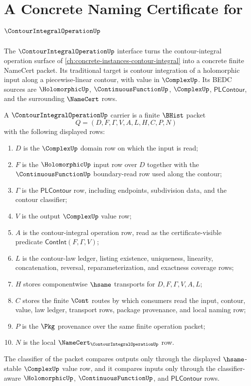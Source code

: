 \chapter{A Concrete Naming Certificate for $\ContourIntegralOperationUp$}
\label{ch:concrete-instances-contourintegraloperation-namecert}

The $\ContourIntegralOperationUp$ interface turns the contour-integral operation surface of \autoref{ch:concrete-instances-contour-integral} into a concrete finite NameCert packet. Its traditional target is contour integration of a holomorphic input along a piecewise-linear contour, with value in $\ComplexUp$. Its BEDC sources are $\HolomorphicUp$, $\ContinuousFunctionUp$, $\ComplexUp$, $\mathsf{PLContour}$, and the surrounding $\NameCert$ rows.

\begin{definition}
\label{def:contour-integral-operation-carrier}
A $\ContourIntegralOperationUp$ carrier is a finite $\BHist$ packet
$$
Q=(D,F,\Gamma,V,A,L,H,C,P,N)
$$
with the following displayed rows:
\begin{enumerate}
\item $D$ is the $\ComplexUp$ domain row on which the input is read;
\item $F$ is the $\HolomorphicUp$ input row over $D$ together with the $\ContinuousFunctionUp$ boundary-read row used along the contour;
\item $\Gamma$ is the $\mathsf{PLContour}$ row, including endpoints, subdivision data, and the contour classifier;
\item $V$ is the output $\ComplexUp$ value row;
\item $A$ is the contour-integral operation row, read as the certificate-visible predicate $\mathsf{ContInt}(F,\Gamma,V)$;
\item $L$ is the contour-law ledger, listing existence, uniqueness, linearity, concatenation, reversal, reparameterization, and exactness coverage rows;
\item $H$ stores componentwise $\hsame$ transports for $D,F,\Gamma,V,A,L$;
\item $C$ stores the finite $\Cont$ routes by which consumers read the input, contour, value, law ledger, transport rows, package provenance, and local naming row;
\item $P$ is the $\Pkg$ provenance over the same finite operation packet;
\item $N$ is the local $\NameCert_{\ContourIntegralOperationUp}$ row.
\end{enumerate}
The classifier of the packet compares outputs only through the displayed $\hsame$-stable $\ComplexUp$ value row, and it compares inputs only through the classifier-aware $\HolomorphicUp$, $\ContinuousFunctionUp$, and $\mathsf{PLContour}$ rows.
\end{definition}

